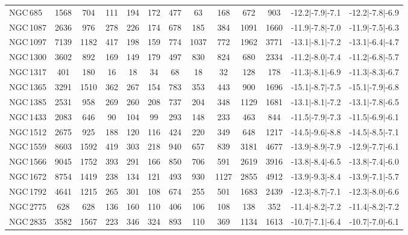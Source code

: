 \begin{table*}
\begin{center}
\begin{tabular}{lcccccccccccc}
NGC\,685 & 1568 & 704 & 111 & 194 & 172 & 477 & 63 & 168 & 672 & 903 & -12.2$\vert$-7.9$\vert$-7.1 & -12.2$\vert$-7.8$\vert$-6.9 \\ 
NGC\,1087 & 2636 & 976 & 278 & 226 & 174 & 678 & 185 & 384 & 1091 & 1660 & -11.9$\vert$-7.8$\vert$-7.0 & -11.9$\vert$-7.5$\vert$-6.3 \\ 
NGC\,1097 & 7139 & 1182 & 417 & 198 & 159 & 774 & 1037 & 772 & 1962 & 3771 & -13.1$\vert$-8.1$\vert$-7.2 & -13.1$\vert$-6.4$\vert$-4.7 \\ 
NGC\,1300 & 3602 & 892 & 169 & 149 & 179 & 497 & 830 & 824 & 680 & 2334 & -11.2$\vert$-8.0$\vert$-7.4 & -11.2$\vert$-6.8$\vert$-5.7 \\ 
NGC\,1317 & 401 & 180 & 16 & 18 & 34 & 68 & 18 & 32 & 128 & 178 & -11.3$\vert$-8.1$\vert$-6.9 & -11.3$\vert$-8.3$\vert$-6.7 \\ 
NGC\,1365 & 3291 & 1510 & 362 & 267 & 154 & 783 & 353 & 443 & 900 & 1696 & -15.1$\vert$-8.7$\vert$-7.5 & -15.1$\vert$-7.9$\vert$-6.8 \\ 
NGC\,1385 & 2531 & 958 & 269 & 260 & 208 & 737 & 204 & 348 & 1129 & 1681 & -13.1$\vert$-8.1$\vert$-7.2 & -13.1$\vert$-7.8$\vert$-6.5 \\ 
NGC\,1433 & 2083 & 646 & 90 & 104 & 99 & 293 & 148 & 233 & 463 & 844 & -11.5$\vert$-7.9$\vert$-7.3 & -11.5$\vert$-6.9$\vert$-6.1 \\ 
NGC\,1512 & 2675 & 925 & 188 & 120 & 116 & 424 & 220 & 349 & 648 & 1217 & -14.5$\vert$-9.6$\vert$-8.8 & -14.5$\vert$-8.5$\vert$-7.1 \\ 
NGC\,1559 & 8603 & 1592 & 419 & 303 & 218 & 940 & 657 & 839 & 3181 & 4677 & -13.9$\vert$-8.9$\vert$-7.9 & -12.9$\vert$-7.7$\vert$-6.1 \\ 
NGC\,1566 & 9045 & 1752 & 393 & 291 & 166 & 850 & 706 & 591 & 2619 & 3916 & -13.8$\vert$-8.4$\vert$-6.5 & -13.8$\vert$-7.4$\vert$-6.0 \\ 
NGC\,1672 & 8754 & 1419 & 238 & 134 & 121 & 493 & 930 & 1127 & 2855 & 4912 & -13.9$\vert$-9.3$\vert$-8.4 & -13.9$\vert$-7.1$\vert$-5.7 \\ 
NGC\,1792 & 4641 & 1215 & 265 & 301 & 108 & 674 & 255 & 501 & 1683 & 2439 & -12.3$\vert$-8.7$\vert$-7.1 & -12.3$\vert$-8.0$\vert$-6.6 \\ 
NGC\,2775 & 628 & 628 & 136 & 160 & 110 & 406 & 106 & 108 & 138 & 352 & -11.4$\vert$-8.2$\vert$-7.2 & -11.4$\vert$-8.2$\vert$-7.2 \\ 
NGC\,2835 & 3582 & 1567 & 223 & 346 & 324 & 893 & 110 & 369 & 1134 & 1613 & -10.7$\vert$-7.1$\vert$-6.4 & -10.7$\vert$-7.0$\vert$-6.1 \\ 

\end{tabular}
\end{center}
\end{table*}
